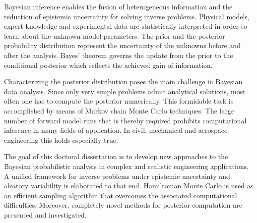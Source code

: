 Bayesian inference enables the fusion of heterogeneous information and the reduction of epistemic uncertainty for solving inverse problems.
Physical models, expert knowledge and experimental data are statistically interpreted in order to learn about the unknown model parameters.
The prior and the posterior probability distribution represent the uncertainty of the unknowns before and after the analysis.
Bayes' theorem governs the update from the prior to the conditional posterior which reflects the achieved gain of information.
\par %
Characterizing the posterior distribution poses the main challenge in Bayesian data analysis.
Since only very simple problems admit analytical solutions, most often one has to compute the posterior numerically.
This formidable task is accomplished by means of Markov chain Monte Carlo techniques.
The large number of forward model runs that is thereby required prohibits computational inference in many fields of application.
In civil, mechanical and aerospace engineering this holds especially true.
\par %
The goal of this doctoral dissertation is to develop new approaches to the Bayesian probabilistic analysis in complex and realistic engineering applications.
A unified framework for inverse problems under epistemic uncertainty and aleatory variability is elaborated to that end.
Hamiltonian Monte Carlo is used as an efficient sampling algorithm that overcomes the associated computational difficulties.
Moreover, completely novel methods for posterior computation are presented and investigated.